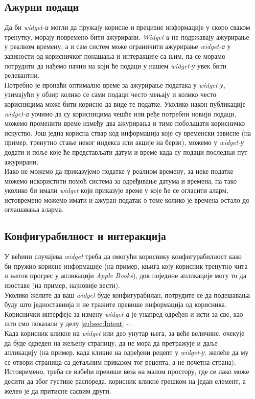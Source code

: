 \documentclass[12pt,oneside]{memoir}
\begin{document}
\subsection{Ажурни подаци}
\indent Да би \textit{widget-и} могли да пружају корисне и прецизне информације у скоро сваком тренутку, морају повремено бити ажурирани. \textit{Widget-и} не подржавају ажурирање у реалном времену, а и сам систем може ограничити ажурирање \textit{widget-а} у завиности од корисничког понашања и интеракције са њим, па се морамо потрудити да нађемо начин на који ће подаци у нашем \textit{widget-у} увек бити релевантни. 
\\
\indent Потребно је пронаћи оптимално време за ажурирање података у \textit{widget-у}, узимајући у обзир колико се сами подаци често мењају и колико често корисницима може бити корисно да виде те податке. Уколико након публикације \textit{widget-а} уочимо да су корисницима чешће или ређе потребни новији подаци, можемо променити време између два ажурирања и тиме побољшати корисничко искуство. Још једна корисна ствар код информација које су временски зависне (на пример, тренутно стање неког индекса или акције на берзи), можемо у \textit{widget-у} додати и поље које ће представљати датум  и време када су подаци последњи пут ажурирани.
\\
\indent Иако не можемо да приказујемо податке у реалном времену, за неке податке можемо искористити помоћ система за одређивање датума и времена, па тако уколико би имали \textit{widget} који приказује време у које ће се огласити аларм, истовремено можемо имати и ажуран податак о томе колико је времена остало до оглашавања аларма.  

\subsection{Конфигурабилност и интеракција}
\indent У већини случајева \textit{widget} треба да омогући кориснику конфигурабилност како би пружио корисне информације (на пример, књига коју корисник тренутно чита и његов прогрес у апликацији \textit{Apple Books}), док поједине апликације могу то да изоставе (на пример, најновије вести). 
\\
\indent Уколико желите да ваш \textit{widget} буде конфигурабилан, потрудите се да подешавања буду што једноставнија и не тражите превише информација од корисника. Кориснички интерфејс за измену \textit{widget-а} је унапред одређен и исти за све, као што смо показали у делу \ref{subsec:Intent} - .
\\
\indent Када корисник кликне на \textit{widget} или део унутар њега, за веће величине, очекује да буде одведен на жељену страницу, да не мора да претражује и даље апликацију (на пример, када кликне на одређени рецепт у \textit{widget-у}, желеће да му се отвори страница са детаљним приказом тог рецепта, а не почетна страна). Истовремено, треба се избећи превише веза на малом простору, где се лако може десити да због густине распореда, корисник кликне грешком на један елемент, а желео је да притисне сасвим други.
\end{document}
